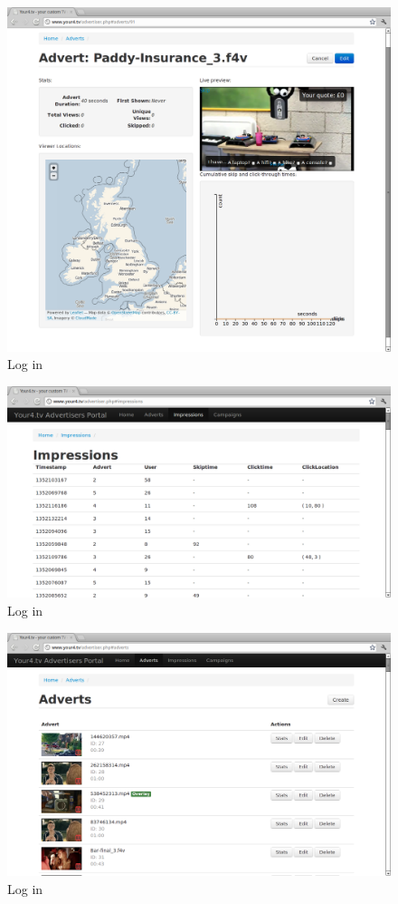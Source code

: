 \begin{figure}[th]
	\centering
	\includegraphics[width=\textwidth]{images/screenshots/advertiser-advert.png}
	\caption{Log in}
	\label{fig:advertiser-advert}
\end{figure}
\begin{figure}[th]
	\centering
	\includegraphics[width=\textwidth]{images/screenshots/advertiser-impressions.png}
	\caption{Log in}
	\label{fig:advertiser-impressions}
\end{figure}
\begin{figure}[th]
	\centering
	\includegraphics[width=\textwidth]{images/screenshots/advertiser-adverts.png}
	\caption{Log in}
	\label{fig:advertiser-adverts}
\end{figure}
